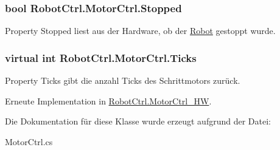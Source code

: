 \hypertarget{class_robot_ctrl_1_1_motor_ctrl_a5d2599ad295ece36d107cc7cb117d9c9}{
\subsubsection[{Stopped}]{\setlength{\rightskip}{0pt plus 5cm}bool RobotCtrl.MotorCtrl.Stopped}}
\label{class_robot_ctrl_1_1_motor_ctrl_a5d2599ad295ece36d107cc7cb117d9c9}
Property Stopped liest aus der Hardware, ob der \hyperlink{class_robot_ctrl_1_1_robot}{Robot} gestoppt wurde. \hypertarget{class_robot_ctrl_1_1_motor_ctrl_a625a8335b71115e58d2d04c59027fb81}{
\subsubsection[{Ticks}]{\setlength{\rightskip}{0pt plus 5cm}virtual int RobotCtrl.MotorCtrl.Ticks}}
\label{class_robot_ctrl_1_1_motor_ctrl_a625a8335b71115e58d2d04c59027fb81}
Property Ticks gibt die anzahl Ticks des Schrittmotors zur\"{u}ck. 

Erneute Implementation in \hyperlink{class_robot_ctrl_1_1_motor_ctrl___h_w_a22603ba1614f7f9eb88f2b7ea0a4c700}{RobotCtrl.MotorCtrl\_\-HW}.



Die Dokumentation für diese Klasse wurde erzeugt aufgrund der Datei:\begin{DoxyCompactItemize}
\item 
MotorCtrl.cs\end{DoxyCompactItemize}
